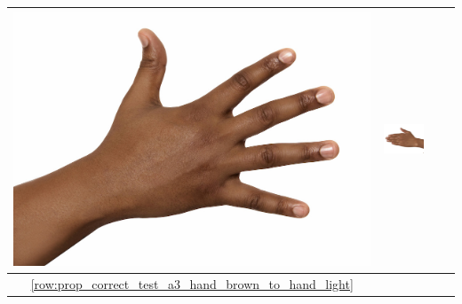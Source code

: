 \begin{longtable}{|c||c|c|c|}
\begin{minipage}{.29\textwidth}
    \includegraphics[width=\textwidth,height=\textheight,keepaspectratio]{../inputs/hand_dark.jpg}
  \end{minipage} & 
  \begin{minipage}{.29\textwidth}
    \includegraphics[width=\textwidth,height=\textheight,keepaspectratio]{../rc_test/outputs/20170517_proportional_corrected_test_alpha3/hand_brown_to_hand_dark.jpg}
  \end{minipage} \\
\hline  \ref{row:prop_correct_test_a3_hand_brown_to_hand_light} &
  \begin{minipage}{.29\textwidth}

\end{minipage}
\end{longtable}
